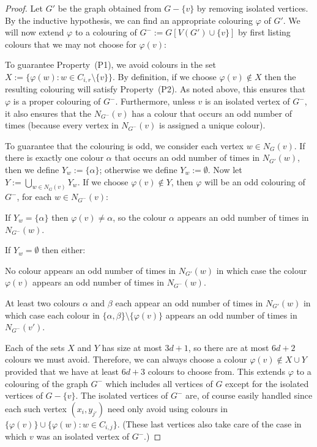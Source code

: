 \documentclass{patmorin}
\begin{document}
\begin{proof}
  Let $G'$ be the graph obtained from $G-\{v\}$ by removing isolated vertices.
  By the inductive hypothesis, we can find an appropriate colouring $\varphi$ of $G'$.  We will now extend $\varphi$ to a colouring of $G^-:=G[V(G')\cup\{v\}]$ by first listing colours that we may not choose for $\varphi(v)$:
  \begin{compactitem}
    \item To guarantee Property~(P1), we avoid colours in the set
      $X:= \{\varphi(w): w\in C_{i,r}\setminus\{v\}\}$.
      By definition, if we choose $\varphi(v)\not\in X$ then the resulting colouring will satisfy Property~(P2).  As noted above, this ensures that $\varphi$ is a proper colouring of $G^-$.  Furthermore, unless $v$ is an isolated vertex of $G^-$, it also ensures that the $N_{G^-}(v)$ has a colour that occurs an odd number of times (because every vertex in $N_{G^-}(v)$ is assigned a unique colour).
    \item To guarantee that the colouring is odd, we consider each vertex $w\in N_G(v)$.  If there is exactly one colour $\alpha$ that occurs an odd number of times in $N_{G'}(w)$, then we define $Y_{w} := \{\alpha\}$; otherwise we define $Y_{w}:=\emptyset$. Now let $Y:=\bigcup_{w\in N_{G}(v)} Y_{w}$.  
    If we choose $\varphi(v)\not\in Y$, then $\varphi$ will be an odd colouring of $G^-$, for each $w\in N_{G^-}(v)$:
    \begin{compactitem}
      \item If $Y_{w}=\{\alpha\}$ then $\varphi(v)\neq\alpha$, so the colour $\alpha$ appears an odd number of times in $N_{G^-}(w)$.
      \item If $Y_{w}=\emptyset$ then either:
      \begin{compactenum}
        \item No colour appears an odd number of times in $N_{G'}(w)$ in which case the colour $\varphi(v)$ appears an odd number of times in $N_{G^-}(w)$.
        \item At least two colours $\alpha$ and $\beta$ each appear an odd number of times in $N_{G'}(w)$ in which case each colour in $\{\alpha,\beta\}\setminus\{\varphi(v)\}$ appears an odd number of times in $N_{G^-}(v')$.
      \end{compactenum}
    \end{compactitem}
  \end{compactitem}
  Each of the sets $X$ and $Y$ has size at most $3d+1$, so there are at most $6d+2$ colours we must avoid.  Therefore, we can always choose a colour $\varphi(v)\not\in X\cup Y$ provided that we have at least $6d+3$ colours to choose from.  This extends $\varphi$ to a colouring of the graph $G^-$ which includes all vertices of $G$ except for the isolated vertices of $G-\{v\}$.  The isolated vertices of $G^-$ are, of course easily handled since each such vertex $(x_i,y_{j'})$ need only avoid using colours in $\{\varphi(v)\}\cup\{\varphi(w):w\in C_{i,j}\}$.  (These last vertices also take care of the case in which $v$ was an isolated vertex of $G^-$.)
\end{proof}
\end{document}
